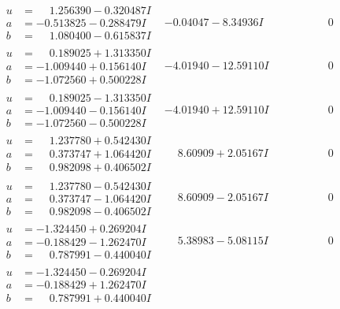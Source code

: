 \documentclass[1p]{elsarticle_modified}
\theoremstyle{definition}
\begin{document}
$$\begin{array}{c|c|c}
\begin{aligned}
u &= \phantom{-}1.256390 - 0.320487 I \\
a &= -0.513825 - 0.288479 I \\
b &= \phantom{-}1.080400 - 0.615837 I\end{aligned}
 & -0.04047 - 8.34936 I & \phantom{-0.000000 } 0 \\ \hline\begin{aligned}
u &= \phantom{-}0.189025 + 1.313350 I \\
a &= -1.009440 + 0.156140 I \\
b &= -1.072560 + 0.500228 I\end{aligned}
 & -4.01940 - 12.59110 I & \phantom{-0.000000 } 0 \\ \hline\begin{aligned}
u &= \phantom{-}0.189025 - 1.313350 I \\
a &= -1.009440 - 0.156140 I \\
b &= -1.072560 - 0.500228 I\end{aligned}
 & -4.01940 + 12.59110 I & \phantom{-0.000000 } 0 \\ \hline\begin{aligned}
u &= \phantom{-}1.237780 + 0.542430 I \\
a &= \phantom{-}0.373747 + 1.064420 I \\
b &= \phantom{-}0.982098 + 0.406502 I\end{aligned}
 & \phantom{-}8.60909 + 2.05167 I & \phantom{-0.000000 } 0 \\ \hline\begin{aligned}
u &= \phantom{-}1.237780 - 0.542430 I \\
a &= \phantom{-}0.373747 - 1.064420 I \\
b &= \phantom{-}0.982098 - 0.406502 I\end{aligned}
 & \phantom{-}8.60909 - 2.05167 I & \phantom{-0.000000 } 0 \\ \hline\begin{aligned}
u &= -1.324450 + 0.269204 I \\
a &= -0.188429 - 1.262470 I \\
b &= \phantom{-}0.787991 - 0.440040 I\end{aligned}
 & \phantom{-}5.38983 - 5.08115 I & \phantom{-0.000000 } 0 \\ \hline\begin{aligned}
u &= -1.324450 - 0.269204 I \\
a &= -0.188429 + 1.262470 I \\
b &= \phantom{-}0.787991 + 0.440040 I\end{aligned}

\end{array}$$
\end{document}
